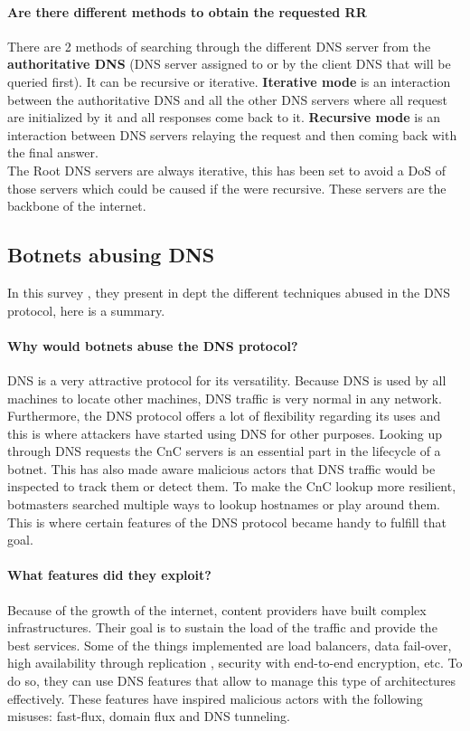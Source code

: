 \paragraph{Are there different methods to obtain the requested RR}
There are 2 methods of searching through the different DNS server from the \textbf{authoritative DNS} (DNS server assigned to or by the client DNS that will be queried first). It can be recursive or iterative. \textbf{Iterative mode} is an interaction between the authoritative DNS and all the other DNS servers where all request are initialized by it and all responses come back to it. \textbf{Recursive mode} is an interaction between DNS servers relaying the request and then coming back with the final answer. \\The Root DNS servers are always iterative, this has been set to avoid a DoS of those servers which could be caused if the were recursive. These servers are the backbone of the internet.

\subsection{Botnets abusing DNS}
In this survey \cite{detection10}, they present in dept the different techniques abused in the DNS protocol, here is a summary.
\paragraph{Why would botnets abuse the DNS protocol?}
DNS is a very attractive protocol for its versatility. Because DNS is used by all machines to locate other machines, DNS traffic is very normal in any network. Furthermore, the DNS protocol offers a lot of flexibility regarding its uses and this is where attackers have started using DNS for other purposes.
Looking up through DNS requests the CnC servers is an essential part in the lifecycle of a botnet. This has also made aware malicious actors that DNS traffic would be inspected to track them or detect them. To make the CnC lookup more resilient, botmasters searched multiple ways to lookup hostnames or play around them. This is where certain features of the DNS protocol became handy to fulfill that goal.
\paragraph{What features did they exploit?}
Because of the growth of the internet, content providers have built complex infrastructures. Their goal is to sustain the load of the traffic and provide the best services. Some of the things implemented are load balancers, data fail-over, high availability through replication , security with end-to-end encryption, etc. To do so, they can use DNS features that allow to manage this type of architectures effectively. These features have inspired malicious actors with the following misuses: fast-flux, domain flux and DNS tunneling.

